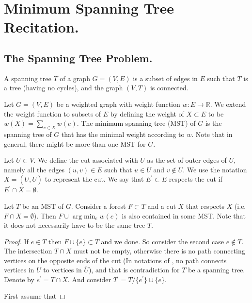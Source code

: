 


\ifdefined\BOOK
\else
\setcounter{chapter}{10}
\fi
\chapter{Minimum Spanning Tree Recitation.} 


\section{The Spanning Tree Problem.}

\begin{definition}
  A spanning tree $T$ of a graph $G=(V,E)$ is a subset of edges in $E$ such that $T$ is a tree (having no cycles), and the graph $(V,T)$ is connected.   
\end{definition}

\begin{problem}[MST] Let $G = (V,E)$ be a weighted graph with weight function $w : E \rightarrow \mathbb{R}$. We extend the weight function to subsets of $E$ by defining the weight of $X\subset E$ to be $w(X)= \sum_{e \in X}w(e)$. The minimum spanning tree (MST) of $G$ is the spanning tree of $G$ that has the minimal weight according to $w$. Note that in general, there might be more than one MST for $G$. 
\end{problem}

\begin{definition}
  \label{def:cut}
  Let $U \subset V$. We define the cut associated with $U$ as the set of outer edges of $U$, namely all the edges $(u,v)\in E$ such that $u\in U$ and $v \notin U$. We use the notation $X = (U, \bar{U})$ to represent the cut. We say that $E^{\prime} \subset E$ respects the cut if $E^{\prime} \cap X = \emptyset$.
\end{definition} 

\begin{lemma} 
  \label{lemma:cut}
  Let $T$ be an MST of $G$. Consider a forest $F \subset T$ and a cut $X$ that respects $X$ (i.e. $F \cap X = \emptyset$). Then $F \cup \text{ arg}\min_{e} w(e)$ is also contained in some MST. Note that it does not necessarily have to be the same tree $T$. 
\end{lemma}

\begin{proof}
  If $e \in T$ then $F \cup \{ e \} \subset T$ and we done. So consider the second case $ e \notin{T} $. The intersection $T\cap X$ must not be empty, otherwise there is no path connecting vertices on the opposite ends of the cut (In notations of , no path connects vertices in $U$ to vertices in $\bar{U}$), and that is contradiction for $T$ be a spanning tree. Denote by $e^{\prime} = T \cap X$. And consider $T^{\prime} = T / \{e^{\prime}\} \cup \{e\}$.

  First assume that 
\end{proof}



